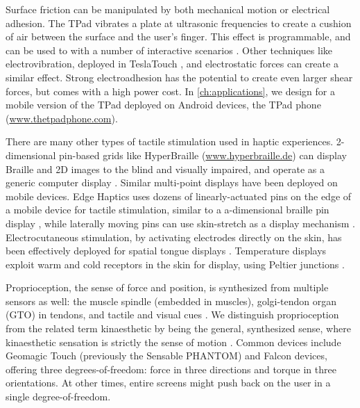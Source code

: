 Surface friction can be manipulated by both mechanical motion or electrical adhesion.
The TPad \cite{Winfield2007a} vibrates a plate at ultrasonic frequencies to create a cushion of air between the surface and the user's finger.
This effect is programmable, and can be used to with a number of interactive scenarios \cite{Levesque2011}.
Other techniques like electrovibration, deployed in TeslaTouch \cite{Bau2010}, and electrostatic forces \cite{Meyer2013} can create a similar effect.
Strong electroadhesion \cite{Shultz2015} has the potential to create even larger shear forces, but comes with a high power cost.
In \autoref{ch:applications}, we design for a mobile version of the TPad deployed on Android devices, the TPad phone (\url{www.thetpadphone.com}).

There are many other types of tactile stimulation used in haptic experiences.
2-dimensional pin-based grids like HyperBraille (\url{www.hyperbraille.de}) can display Braille and 2D images to the blind and visually impaired, and operate as a generic computer display \cite{Prescher2010}.
Similar multi-point displays have been deployed on mobile devices.
Edge Haptics uses dozens of linearly-actuated pins on the edge of a mobile device for tactile stimulation, similar to a a-dimensional braille pin display \cite{Jang2016}, while laterally moving pins can use skin-stretch as a display mechanism \cite{Luk2006}.
Electrocutaneous stimulation, by activating electrodes directly on the skin, has been effectively deployed for spatial tongue displays \cite{Bach-y-Rita1998}.
Temperature displays exploit warm and cold receptors in the skin for display, using Peltier junctions \cite{Jones2002}.





Proprioception, the sense of force and position, is synthesized from multiple sensors as well: the muscle spindle (embedded in muscles), golgi-tendon organ (GTO) in tendons, and tactile and visual cues \cite{Kandel2000}.
We distinguish proprioception from the related term kinaesthetic by being the general, synthesized sense, where kinaesthetic sensation is strictly the sense of motion .
Common devices include Geomagic Touch (previously the Sensable PHANTOM) and Falcon devices, offering three degrees-of-freedom: force in three directions and torque in three orientations.
At other times, entire screens might push back on the user in a single degree-of-freedom.




